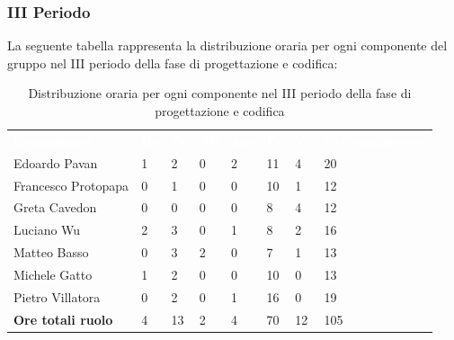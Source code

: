 \subsubsection{III Periodo}
La seguente tabella rappresenta la distribuzione oraria per ogni componente del gruppo nel III periodo della fase di progettazione e codifica:
\begin{table}[H]
\begin{center}
\renewcommand{\arraystretch}{1.25}
\begin{tabular}{ m{}<{\centering}  m{}<{\centering} m{}<{\centering} m{}<{\centering}  m{}<{\centering}  m{}<{\centering}  m{}<{\centering}  m{}<{\centering}   }
	\rowcolor{darkblue}
	\textcolor{white}{\textbf{Componente}} &\textcolor{white}{\textbf{Re}}&\textcolor{white}{\textbf{Pt}}&\textcolor{white}{\textbf{An}}&\textcolor{white}{\textbf{Am}}&\textcolor{white}{\textbf{Pr}}&\textcolor{white}{\textbf{Ve}}&\textcolor{white}{\textbf{Ore complessive}}\\ 
	Edoardo Pavan & 1 & 2 & 0 & 2 & 11 & 4 & 20 \\	
	
	Francesco Protopapa & 0 & 1 & 0 & 0 & 10 & 1 & 12 \\

	Greta Cavedon & 0 & 0 & 0 & 0 & 8 & 4 & 12 \\
	
	Luciano Wu & 2 & 3 & 0 & 1 & 8 & 2 & 16 \\
	
	Matteo Basso & 0 & 3 & 2 & 0 & 7 & 1 & 13 \\
	
	Michele Gatto & 1  & 2 & 0 & 0 & 10 & 0 & 13 \\
	
	Pietro Villatora & 0 & 2 & 0 & 1 & 16 & 0 & 19 \\
	
	\textbf{Ore totali ruolo} & 4 & 13 & 2 & 4 & 70 & 12 & 105 \\

\end{tabular}
\caption{Distribuzione oraria per ogni componente nel III periodo della fase di progettazione e codifica}
\end{center}
\end{table}


